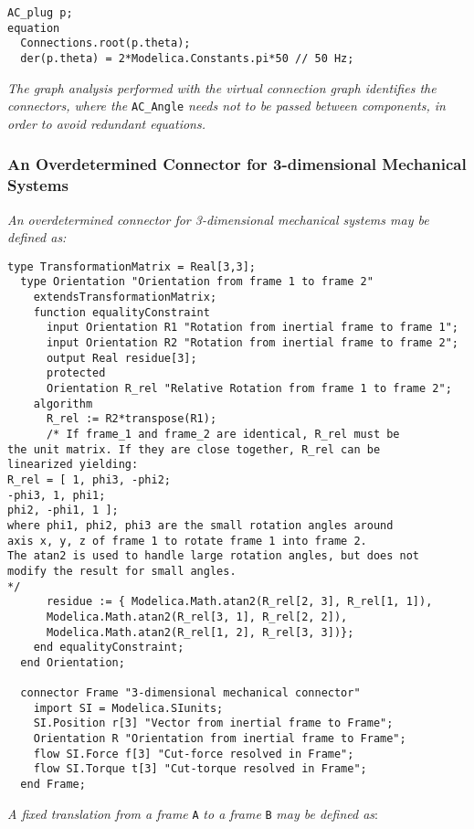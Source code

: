 \begin{lstlisting}[language=modelica]
  AC_plug p;
equation
  Connections.root(p.theta);
  der(p.theta) = 2*Modelica.Constants.pi*50 // 50 Hz;
\end{lstlisting}
\emph{The graph analysis performed with the virtual connection graph
identifies the connectors, where the} \lstinline!AC_Angle! \emph{needs not to be
passed between components, in order to avoid redundant equations.}

\subsubsection{An Overdetermined Connector for 3-dimensional Mechanical Systems}

\emph{An overdetermined connector for 3-dimensional mechanical systems
may be defined as:}

\begin{lstlisting}[language=modelica]
  type TransformationMatrix = Real[3,3];
  type Orientation "Orientation from frame 1 to frame 2"
    extendsTransformationMatrix;
    function equalityConstraint
      input Orientation R1 "Rotation from inertial frame to frame 1";
      input Orientation R2 "Rotation from inertial frame to frame 2";
      output Real residue[3];
      protected
      Orientation R_rel "Relative Rotation from frame 1 to frame 2";
    algorithm
      R_rel := R2*transpose(R1);
      /* If frame_1 and frame_2 are identical, R_rel must be
the unit matrix. If they are close together, R_rel can be
linearized yielding:
R_rel = [ 1, phi3, -phi2;
-phi3, 1, phi1;
phi2, -phi1, 1 ];
where phi1, phi2, phi3 are the small rotation angles around
axis x, y, z of frame 1 to rotate frame 1 into frame 2.
The atan2 is used to handle large rotation angles, but does not
modify the result for small angles.
*/
      residue := { Modelica.Math.atan2(R_rel[2, 3], R_rel[1, 1]),
      Modelica.Math.atan2(R_rel[3, 1], R_rel[2, 2]),
      Modelica.Math.atan2(R_rel[1, 2], R_rel[3, 3])};
    end equalityConstraint;
  end Orientation;

  connector Frame "3-dimensional mechanical connector"
    import SI = Modelica.SIunits;
    SI.Position r[3] "Vector from inertial frame to Frame";
    Orientation R "Orientation from inertial frame to Frame";
    flow SI.Force f[3] "Cut-force resolved in Frame";
    flow SI.Torque t[3] "Cut-torque resolved in Frame";
  end Frame;
\end{lstlisting}
\emph{A fixed translation from a frame} \lstinline!A! \emph{to a frame} \lstinline!B! \emph{may
be defined as}:

